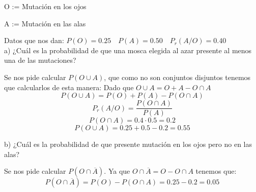 O := Mutación en los ojos

A := Mutación en las alas

Datos que nos dan: $P(O) = 0.25 \quad P(A) = 0.50 \quad P_r(A/O) = 0.40$\\

a) ¿Cuál es la probabilidad de que una mosca elegida al azar presente al menos una de las mutaciones?

Se nos pide calcular $P(O \cup A)$, que como no son conjuntos disjuntos tenemos que calcularlos de esta manera: Dado que $O \cup A = O + A - O \cap A$ \\
$$P(O \cup A) = P(O) + P(A) - P(O \cap A)$$
$$P_r(A/O) = \dfrac{P(O \cap A)}{P(A)}$$
$$P(O \cap A) = 0.4 \cdot 0.5 = 0.2$$
$$P(O \cup A) = 0.25 + 0.5 - 0.2 = 0.55$$

b) ¿Cuál es la probabilidad de que presente mutación en los ojos pero no en las alas?

Se nos pide calcular $P(O \cap \overline{A})$. Ya que $O \cap \overline{A} = O - O \cap A$ tenemos que:
$$P(O \cap \overline{A}) = P(O) - P(O \cap A) = 0.25 - 0.2 = 0.05$$
